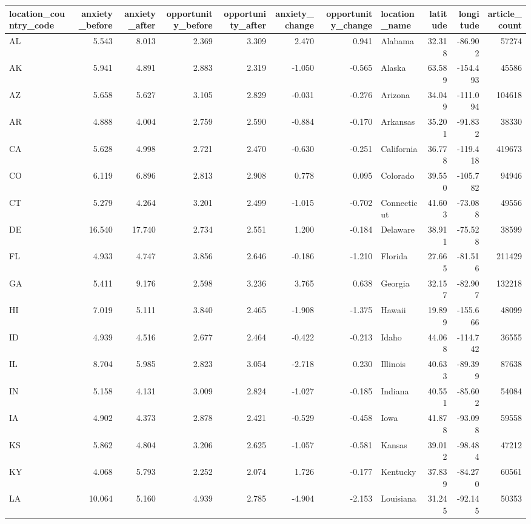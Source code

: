 \begin{tabular}{lrrrrrrlrrr}
\toprule
location\_country\_code & anxiety\_before & anxiety\_after & opportunity\_before & opportunity\_after & anxiety\_change & opportunity\_change & location\_name & latitude & longitude & article\_count \\
\midrule
AL & 5.543 & 8.013 & 2.369 & 3.309 & 2.470 & 0.941 & Alabama & 32.318 & -86.902 & 57274 \\
AK & 5.941 & 4.891 & 2.883 & 2.319 & -1.050 & -0.565 & Alaska & 63.589 & -154.493 & 45586 \\
AZ & 5.658 & 5.627 & 3.105 & 2.829 & -0.031 & -0.276 & Arizona & 34.049 & -111.094 & 104618 \\
AR & 4.888 & 4.004 & 2.759 & 2.590 & -0.884 & -0.170 & Arkansas & 35.201 & -91.832 & 38330 \\
CA & 5.628 & 4.998 & 2.721 & 2.470 & -0.630 & -0.251 & California & 36.778 & -119.418 & 419673 \\
CO & 6.119 & 6.896 & 2.813 & 2.908 & 0.778 & 0.095 & Colorado & 39.550 & -105.782 & 94946 \\
CT & 5.279 & 4.264 & 3.201 & 2.499 & -1.015 & -0.702 & Connecticut & 41.603 & -73.088 & 49556 \\
DE & 16.540 & 17.740 & 2.734 & 2.551 & 1.200 & -0.184 & Delaware & 38.911 & -75.528 & 38599 \\
FL & 4.933 & 4.747 & 3.856 & 2.646 & -0.186 & -1.210 & Florida & 27.665 & -81.516 & 211429 \\
GA & 5.411 & 9.176 & 2.598 & 3.236 & 3.765 & 0.638 & Georgia & 32.157 & -82.907 & 132218 \\
HI & 7.019 & 5.111 & 3.840 & 2.465 & -1.908 & -1.375 & Hawaii & 19.899 & -155.666 & 48099 \\
ID & 4.939 & 4.516 & 2.677 & 2.464 & -0.422 & -0.213 & Idaho & 44.068 & -114.742 & 36555 \\
IL & 8.704 & 5.985 & 2.823 & 3.054 & -2.718 & 0.230 & Illinois & 40.633 & -89.399 & 87638 \\
IN & 5.158 & 4.131 & 3.009 & 2.824 & -1.027 & -0.185 & Indiana & 40.551 & -85.602 & 54084 \\
IA & 4.902 & 4.373 & 2.878 & 2.421 & -0.529 & -0.458 & Iowa & 41.878 & -93.098 & 59558 \\
KS & 5.862 & 4.804 & 3.206 & 2.625 & -1.057 & -0.581 & Kansas & 39.012 & -98.484 & 47212 \\
KY & 4.068 & 5.793 & 2.252 & 2.074 & 1.726 & -0.177 & Kentucky & 37.839 & -84.270 & 60561 \\
LA & 10.064 & 5.160 & 4.939 & 2.785 & -4.904 & -2.153 & Louisiana & 31.245 & -92.145 & 50353 \\

\end{tabular}
